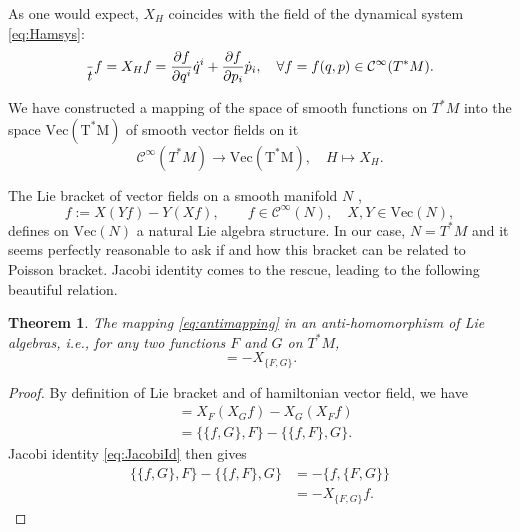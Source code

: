 \documentclass[english,fontsize=11pt,paper=a5,oneside]{scrbook}
\newcommand{\cC}{\mathcal{C}}
\let\d\relax
\newcommand{\d}{\mathrm{d}}
\newtheorem{theorem}{Theorem}[chapter]
\theoremstyle{definition}
\newenvironment{remark}
  {\pushQED{\qed}\renewcommand{\qedsymbol}{$\lozenge$}\remarkx}
  {\popQED\endremarkx}
\begin{document}
\begin{remark}
  As one would expect, $X_H$ coincides with the field of the dynamical system \eqref{eq:Hamsys}:
  \begin{equation}
    \frac{\d}{\d t} f = X_H f = \frac{\partial f}{\partial q^i}\dot q^i + \frac{\partial f}{\partial p_i} \dot p_i, \quad \forall f=f(q,p)\in\cC^\infty(T^* M).
  \end{equation}
\end{remark}

We have constructed a mapping of the space of smooth functions on $T^*M$ into the space $\mathrm{Vec(T^* M)}$ of smooth vector fields on it
\begin{equation}\label{eq:antimapping}
  \cC^\infty (T^*M) \to \mathrm{Vec(T^* M)}, \quad H \mapsto X_H.
\end{equation}

The Lie bracket of vector fields on a smooth manifold $N$ \cite{book:lee},
\begin{equation}
  [X,Y] f := X(Y f) - Y(X f), \qquad f\in\cC^\infty(N), \quad X,Y\in\mathrm{Vec}(N),
\end{equation}
defines on $\mathrm{Vec}(N)$ a natural Lie algebra structure.
In our case, $N = T^* M$ and it seems perfectly reasonable to ask if and how this bracket can be related to Poisson bracket.
Jacobi identity comes to the rescue, leading to the following beautiful relation.

\begin{theorem}\label{thm:antihom}
  The mapping \eqref{eq:antimapping} in an \emph{anti-homomorphism} of Lie algebras, i.e., for any two functions $F$ and $G$ on $T^*M$,
  \begin{equation}
    [X_{F}, X_{G}] = - X_{\big\{F, G\big\}}.
  \end{equation}
\end{theorem}
\begin{proof}
  By definition of Lie bracket and of hamiltonian vector field, we have
  \begin{align}
    [X_{F}, X_{G}] & = X_{F}(X_{G} f) - X_{G}(X_{F} f)                                    \\
                   & = \big\{\big\{f, G\big\}, F\big\} - \big\{\big\{f, F\big\}, G\big\}.
  \end{align}
  Jacobi identity \eqref{eq:JacobiId} then gives
  \begin{align}
    \big\{\big\{f, G\big\}, F\big\} - \big\{\big\{f, F\big\}, G\big\} & = - \big\{f,\big\{F,G\big\}\big\} \\
                                                                      & = - X_{\big\{F, G\big\}} f.
  \end{align}
\end{proof}
\end{document}
